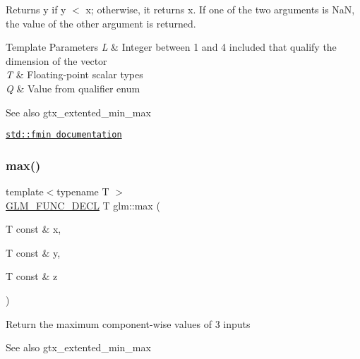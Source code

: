 Returns y if y $<$ x; otherwise, it returns x. If one of the two arguments is NaN, the value of the other argument is returned.


\begin{DoxyTemplParams}{Template Parameters}
{\em L} & Integer between 1 and 4 included that qualify the dimension of the vector \\
\hline
{\em T} & Floating-\/point scalar types \\
\hline
{\em Q} & Value from qualifier enum\\
\hline
\end{DoxyTemplParams}
\begin{DoxySeeAlso}{See also}
gtx\+\_\+extented\+\_\+min\+\_\+max 

\href{http://en.cppreference.com/w/cpp/numeric/math/fmin}{\tt std\+::fmin documentation} 
\end{DoxySeeAlso}
\mbox{\label{group__gtx__extended__min__max_ga04991ccb9865c4c4e58488cfb209ce69}} 
\subsubsection{\texorpdfstring{max()}{max()}\hspace{0.1cm}{\footnotesize\ttfamily [1/6]}}
{\footnotesize\ttfamily template$<$typename T $>$ \\
\mbox{\hyperlink{setup_8hpp_ab2d052de21a70539923e9bcbf6e83a51}{G\+L\+M\+\_\+\+F\+U\+N\+C\+\_\+\+D\+E\+CL}} T glm\+::max (\begin{DoxyParamCaption}\item[{T const \&}]{x,  }\item[{T const \&}]{y,  }\item[{T const \&}]{z }\end{DoxyParamCaption})}

Return the maximum component-\/wise values of 3 inputs \begin{DoxySeeAlso}{See also}
gtx\+\_\+extented\+\_\+min\+\_\+max 
\end{DoxySeeAlso}
\mbox{\label{group__gtx__extended__min__max_gae1b7bbe5c91de4924835ea3e14530744}} 
